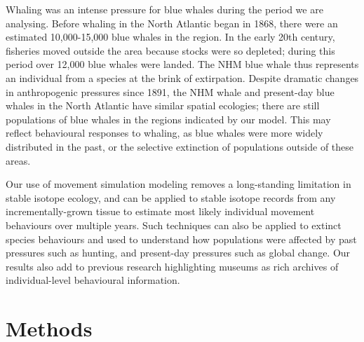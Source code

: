 \documentclass[a4paper,12pt]{article}
\begin{document}
Whaling was an intense pressure for blue whales during the period we are analysing. 
Before whaling in the North Atlantic began in 1868\cite{reilly2008balaenoptera}, there were an estimated 10,000-15,000 blue whales in the region\cite{sigurjonsson1995life}. 
In the early 20th century, fisheries moved outside the area because stocks were so depleted\cite{reilly2008balaenoptera}; during this period over 12,000 blue whales were landed\cite{sigurjonsson1995life}. 
The NHM blue whale thus represents an individual from a species at the brink of extirpation.
Despite dramatic changes in anthropogenic pressures since 1891, the NHM whale and present-day blue whales in the North Atlantic have similar spatial ecologies; there are still populations of blue whales in the regions indicated by our model. This may reflect behavioural responses to whaling, as blue whales were more widely distributed in the past\cite{reeves2004historical}, or the selective extinction of populations outside of these areas.

Our use of movement simulation modeling removes a long-standing limitation in stable isotope ecology, and can be applied to stable isotope records from any incrementally-grown tissue to estimate most likely individual movement behaviours over multiple years. 
Such techniques can also be applied to extinct species behaviours and used to understand how populations were affected by past pressures such as hunting, and present-day pressures such as global change. 
Our results also add to previous research\cite{lister2011natural,ryan2013stable} highlighting museums as rich archives of individual-level behavioural information.

\section{Methods}
\end{document}
